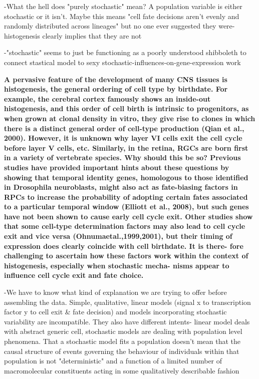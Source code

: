 \documentclass{ut-thesis}
\begin{document}
\bigskip

-What the hell does "purely stochastic" mean? A population variable is either stochastic or it isn't. Maybe this means "cell fate decisions aren't evenly and randomly distributed across lineages" but no one ever suggested they were- histogenesis clearly implies that they are not

-"stochastic" seems to just be functioning as a poorly understood shibboleth to connect stastical model to sexy stochastic-influences-on-gene-expression work

\bigskip

\textbf{
A pervasive feature of the development of many CNS tissues
is histogenesis, the general ordering of cell type by birthdate.
For example, the cerebral cortex famously shows an inside-out
histogenesis, and this order of cell birth is intrinsic to progenitors,
as when grown at clonal density in vitro, they give rise to clones in
which there is a distinct general order of cell-type production
(Qian et al., 2000). However, it is unknown why layer VI cells
exit the cell cycle before layer V cells, etc. Similarly, in the retina,
RGCs are born first in a variety of vertebrate species. Why should
this be so? Previous studies have provided important hints
about these questions by showing that temporal identity genes,
homologous to those identified in Drosophila neuroblasts, might
also act as fate-biasing factors in RPCs to increase the probability
of adopting certain fates associated to a particular temporal
window (Elliott et al., 2008), but such genes have not been
shown to cause early cell cycle exit. Other studies show that
some cell-type determination factors may also lead to cell cycle
exit and vice versa (Ohnumaetal.,1999,2001), but their timing of
expression does clearly coincide with cell birthdate. It is there-
fore challenging to ascertain how these factors work within the
context of histogenesis, especially when stochastic mecha-
nisms appear to influence cell cycle exit and fate choice.}

\bigskip

-We have to know what kind of explanation we are trying to offer before assembling the data. Simple, qualitative, linear models (signal x to transcription factor y to cell exit & fate decision) and models incorporating stochastic variability are incompatible. They also have different intents- linear model deals with abstract generic cell, stochastic models are dealing with population level phenomena. That a stochastic model fits a population doesn't mean that the causal structure of events governing the behaviour of individuals within that population is not "deterministic" and a function of a limited number of macromolecular constituents acting in some qualitatively describable fashion
\end{document}
